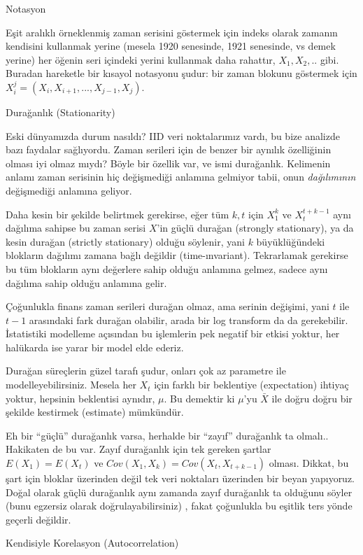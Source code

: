 \documentclass[12pt,fleqn]{article}\usepackage{../../common}
\begin{document}
Notasyon

Eşit aralıklı örneklenmiş zaman serisini göstermek için indeks olarak
zamanın kendisini kullanmak yerine (mesela 1920 senesinde, 1921 senesinde,
vs demek yerine) her öğenin seri içindeki yerini kullanmak daha rahattır,
$X_1,X_2,..$ gibi. Buradan hareketle bir kısayol notasyonu şudur: bir zaman
blokunu göstermek için $X_i^j = (X_i,X_{i+1},...,X_{j-1},X_j)$.

Durağanlık (Stationarity)

Eski dünyamızda durum nasıldı? IID veri noktalarımız vardı, bu bize analizde
bazı faydalar sağlıyordu. Zaman serileri için de benzer bir aynılık özelliğinin
olması iyi olmaz mıydı?  Böyle bir özellik var, ve ismi durağanlık. Kelimenin
anlamı zaman serisinin hiç değişmediği anlamına gelmiyor tabii, onun {\em
  dağılımının} değişmediği anlamına geliyor.

Daha kesin bir şekilde belirtmek gerekirse, eğer tüm $k,t$ için $X_1^k$ ve
$X_t^{t+k-1}$ aynı dağılıma sahipse bu zaman serisi $X$'in güçlü durağan
(strongly stationary), ya da kesin durağan (strictly stationary) olduğu
söylenir, yani $k$ büyüklüğündeki blokların dağılımı zamana bağlı değildir
(time-ınvariant). Tekrarlamak gerekirse bu tüm blokların aynı değerlere sahip
olduğu anlamına gelmez, sadece aynı dağılıma sahip olduğu anlamına gelir.

Çoğunlukla finans zaman serileri durağan olmaz, ama serinin değişimi, yani $t$
ile $t-1$ arasındaki fark durağan olabilir, arada bir log transform da da
gerekebilir. İstatistiki modelleme açısından bu işlemlerin pek negatif bir
etkisi yoktur, her halükarda ise yarar bir model elde ederiz.

Durağan süreçlerin güzel tarafı şudur, onları çok az parametre ile
modelleyebilirsiniz. Mesela her $X_t$ için farklı bir beklentiye (expectation)
ihtiyaç yoktur, hepsinin beklentisi aynıdır, $\mu$. Bu demektir ki $\mu$'yu
$\bar{X}$ ile doğru doğru bir şekilde kestirmek (estimate) mümkündür.

Eh bir ``güçlü'' durağanlık varsa, herhalde bir ``zayıf'' durağanlık ta
olmalı.. Hakikaten de bu var. Zayıf durağanlık için tek gereken şartlar $E(X_1)
= E(X_t)$ ve $Cov(X_1,X_k) = Cov(X_t,X_{t+k-1})$ olması. Dikkat, bu şart için
bloklar üzerinden değil tek veri noktaları üzerinden bir beyan yapıyoruz. Doğal
olarak güçlü durağanlık aynı zamanda zayıf durağanlık ta olduğunu söyler (bunu
egzersiz olarak doğrulayabilirsiniz) , fakat çoğunlukla bu eşitlik ters yönde
geçerli değildir.

Kendisiyle Korelasyon (Autocorrelation) 
\end{document}
